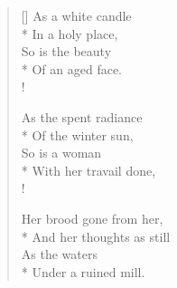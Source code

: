 \documentclass[MAIN]{subfiles}
\begin{document}
\settowidth{\versewidth}{\vin In a holy place,}
\begin{verse}[\versewidth]
As a white candle\\*
\vin In a holy place,\\
So is the beauty\\*
\vin Of an aged face.\\!

As the spent radiance\\*
\vin Of the winter sun,\\
So is a woman\\*
\vin With her travail done,\\!

Her brood gone from her,\\*
\vin And her thoughts as still\\
As the waters\\*
\vin Under a ruined mill.
\end{verse}
\end{document}
